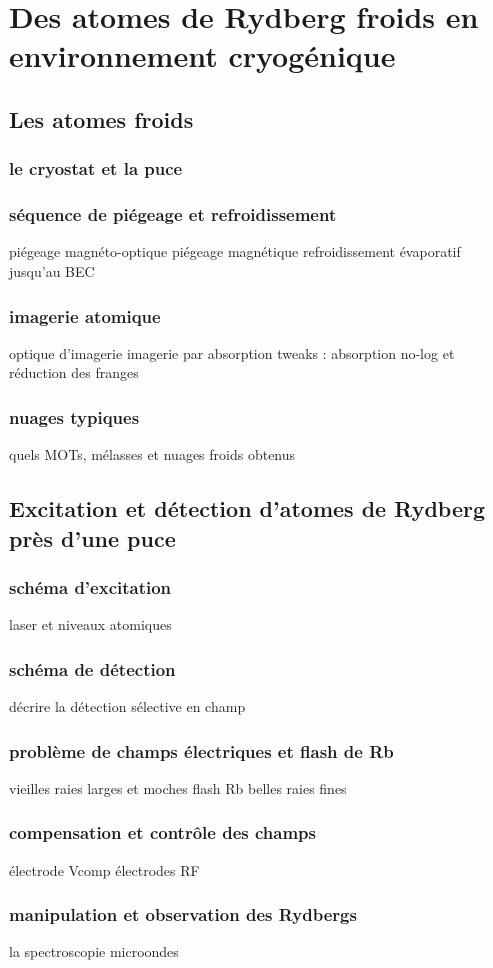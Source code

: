 \chapter{Des atomes de Rydberg froids en environnement cryogénique}
\label{chapter:setup_coldatoms_Rydberg}

\section{Les atomes froids}
	\subsection{le cryostat et la puce}
	\subsection{séquence de piégeage et refroidissement}
		\noindent piégeage magnéto-optique
		\noindent piégeage magnétique
		\noindent refroidissement évaporatif jusqu'au BEC
	\subsection{imagerie atomique}
		\noindent optique d'imagerie
		\noindent imagerie par absorption
		\noindent tweaks : absorption no-log et réduction des franges
	\subsection{nuages typiques}
		\noindent quels MOTs, mélasses et nuages froids obtenus

\section{Excitation et détection d'atomes de Rydberg près d'une puce}
	\subsection{schéma d'excitation}
		\noindent laser et niveaux atomiques
	\subsection{schéma de détection}
		\noindent décrire la détection sélective en champ
	\subsection{problème de champs électriques et flash de Rb}
		\noindent vieilles raies larges et moches
		\noindent flash Rb
		\noindent belles raies fines
	\subsection{compensation et contrôle des champs}
		\noindent électrode Vcomp
		\noindent électrodes RF
	\subsection{manipulation et observation des Rydbergs}
		\noindent la spectroscopie microondes